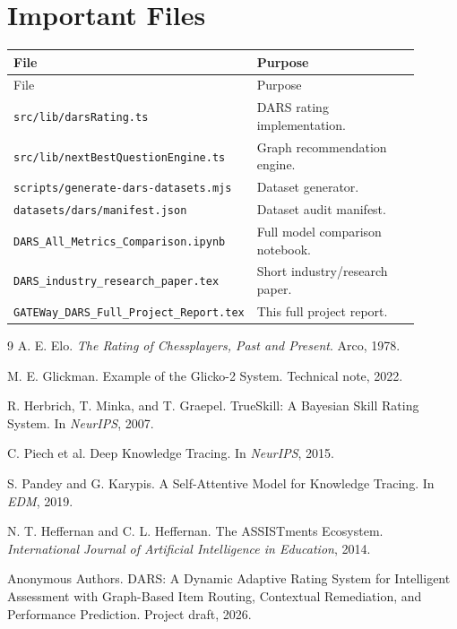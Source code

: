 \documentclass[12pt,a4paper]{report}
\begin{document}
\chapter{Important Files}
\begin{longtable}{p{0.42\linewidth}p{0.48\linewidth}}
\toprule
File & Purpose \\
\midrule
\endfirsthead
\toprule
File & Purpose \\
\midrule
\endhead
\texttt{src/lib/darsRating.ts} & DARS rating implementation.\\
\texttt{src/lib/nextBestQuestionEngine.ts} & Graph recommendation engine.\\
\texttt{scripts/generate-dars-datasets.mjs} & Dataset generator.\\
\texttt{datasets/dars/manifest.json} & Dataset audit manifest.\\
\texttt{DARS\_All\_Metrics\_Comparison.ipynb} & Full model comparison notebook.\\
\texttt{DARS\_industry\_research\_paper.tex} & Short industry/research paper.\\
\texttt{GATEWay\_DARS\_Full\_Project\_Report.tex} & This full project report.\\
\bottomrule
\end{longtable}

\begin{thebibliography}{9}
A. E. Elo. \textit{The Rating of Chessplayers, Past and Present}. Arco, 1978.

M. E. Glickman. Example of the Glicko-2 System. Technical note, 2022.

R. Herbrich, T. Minka, and T. Graepel. TrueSkill: A Bayesian Skill Rating System. In \textit{NeurIPS}, 2007.

C. Piech et al. Deep Knowledge Tracing. In \textit{NeurIPS}, 2015.

S. Pandey and G. Karypis. A Self-Attentive Model for Knowledge Tracing. In \textit{EDM}, 2019.

N. T. Heffernan and C. L. Heffernan. The ASSISTments Ecosystem. \textit{International Journal of Artificial Intelligence in Education}, 2014.

Anonymous Authors. DARS: A Dynamic Adaptive Rating System for Intelligent Assessment with Graph-Based Item Routing, Contextual Remediation, and Performance Prediction. Project draft, 2026.
\end{thebibliography}
\end{document}
